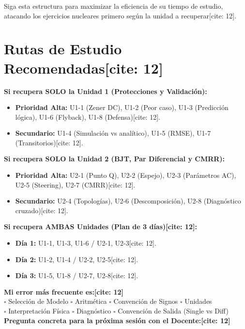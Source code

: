 \documentclass[11pt, a4paper]{article}
\begin{document}
\begin{tcolorbox}[colback=ucbblue!5, colframe=ucbblue, title=\textbf{PARTE III — Plan de Trabajo Autónomo de Recuperación[cite: 12]}]
    Siga esta estructura para maximizar la eficiencia de su tiempo de estudio, atacando los ejercicios nucleares primero según la unidad a recuperar[cite: 12].
\end{tcolorbox}

\section*{Rutas de Estudio Recomendadas[cite: 12]}
\textbf{Si recupera SOLO la Unidad 1 (Protecciones y Validación):}
\begin{itemize}
    \item \textbf{Prioridad Alta:} U1-1 (Zener DC), U1-2 (Peor caso), U1-3 (Predicción lógica), U1-6 (Flyback), U1-8 (Defensa)[cite: 12].
    \item \textbf{Secundario:} U1-4 (Simulación vs analítico), U1-5 (RMSE), U1-7 (Transitorios)[cite: 12].
\end{itemize}

\textbf{Si recupera SOLO la Unidad 2 (BJT, Par Diferencial y CMRR):}
\begin{itemize}
    \item \textbf{Prioridad Alta:} U2-1 (Punto Q), U2-2 (Espejo), U2-3 (Parámetros AC), U2-5 (Steering), U2-7 (CMRR)[cite: 12].
    \item \textbf{Secundario:} U2-4 (Topologías), U2-6 (Descomposición), U2-8 (Diagnóstico cruzado)[cite: 12].
\end{itemize}

\textbf{Si recupera AMBAS Unidades (Plan de 3 días)[cite: 12]:}
\begin{itemize}
    \item \textbf{Día 1:} U1-1, U1-3, U1-6 / U2-1, U2-3[cite: 12].
    \item \textbf{Día 2:} U1-2, U1-4 / U2-2, U2-5[cite: 12].
    \item \textbf{Día 3:} U1-5, U1-8 / U2-7, U2-8[cite: 12].
\end{itemize}

\vspace{0.5cm}
\begin{tcolorbox}[colback=white, colframe=black, title=\textbf{Registro Personal de Errores (Autoevaluación)[cite: 12]}]
    \textbf{Mi error más frecuente es:[cite: 12]} \\
    $\square$ Selección de Modelo \quad $\square$ Aritmética \quad $\square$ Convención de Signos \quad $\square$ Unidades \\
    $\square$ Interpretación Física \quad $\square$ Diagnóstico \quad $\square$ Convención de Salida (Single vs Diff) \\[0.3cm]
    \textbf{Pregunta concreta para la próxima sesión con el Docente:[cite: 12]} \hrulefill
\end{tcolorbox}
\end{document}
